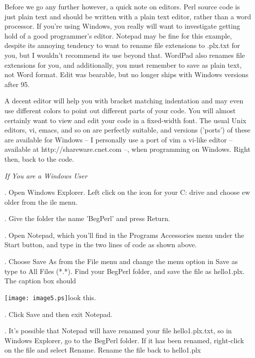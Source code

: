 \documentclass[a4paper,11pt]{book}
\begin{document}
\noindent 

\noindent Before we go any further however, a quick note on editors. Perl source code is just plain text and should be written with a plain text editor, rather than a word processor. If you're using Windows, you really will want to investigate getting hold of a good programmer's editor. Notepad may be fine for this example, despite its annoying tendency to want to rename file extensions to .plx.txt for you, but I wouldn't recommend its use beyond that. WordPad also renames file extensions for you, and additionally, you must remember to save as plain text, not Word format. Edit was bearable, but no longer ships with Windows versions after 95.

\noindent 

\noindent A decent editor will help you with bracket matching indentation and may even use different colors to point out different parts of your code. You will almost certainly want to view and edit your code in a fixed-width font. The usual Unix editors, vi, emacs, and so on are perfectly suitable, and versions ('ports') of these are available for Windows -- I personally use a port of vim a vi-like editor -- available at http://shareware.cnet.com --, when programming on Windows. Right then, back to the code.

\noindent \textit{If You are a Windows User}

. Open Windows Explorer. Left click on the icon for your C: drive and choose ew \textbar {}older from the ile menu.

. Give the folder the name 'BegPerl' and press Return.

. Open Notepad, which you'll find in the Programs \textbar Accessories menu under the Start button, and type in the two lines of code as shown above.

. Choose Save As from the File menu and change the menu option in Save as type to All Files (*.*). Find your BegPerl folder, and save the file as hello1.plx. The caption box should

\noindent \texttt{[image: image5.ps]}look this.

\noindent 

. Click Save and then exit Notepad.

. It's possible that Notepad will have renamed your file hello1.plx.txt, so in Windows Explorer, go to the BegPerl folder. If it has been renamed, right-click on the file and select Rename. Rename the file back to hello1.plx
\end{document}
